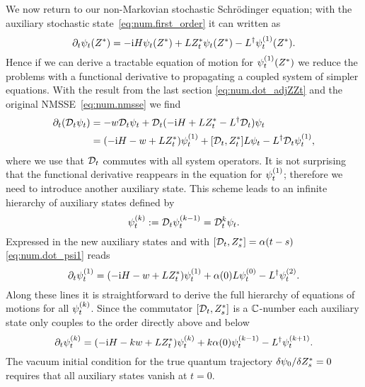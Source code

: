 We now return to our non-Markovian stochastic Schrödinger equation; with the auxiliary stochastic state~\ref{eq:num.first_order} it can written as
\begin{equation*}
  \partial_t \psitZ = -\ii\Hsys\psitZ + L\ZZ_t\psitZ - \adj{L}\psitZ[1].
\end{equation*}
Hence if we can derive a tractable equation of motion for $\psitZ[1]$ we reduce the problems with a functional derivative to propagating a coupled system of simpler equations.
With the result from the last section \autoref{eq:num.dot_adjZZt} and the original NMSSE~\ref{eq:num.nmsse} we find
\begin{align}
  \partial_t (\adjZZ_t \psi_t) &= - w \adjZZ_t\psi_t + \adjZZ_t ( -\ii\Hsys + L\ZZ_t - \adj{L} \adjZZ_t ) \psi_t \nonumber \\
  &= (-\ii\Hsys - w + L\ZZ_t) \psit[1] + [\adjZZ_t, \ZZ_t] L\psit - \adj{L} \adjZZ_t \psit[1],
  \label{eq:num.dot_psi1}
\end{align}
where we use that $\mathcal{D}_t$ commutes with all system operators.
It is not surprising that the functional derivative reappears in the equation for $\psit[1]$; therefore we need to introduce another auxiliary state.
This scheme leads to an infinite hierarchy of auxiliary states defined by
\begin{equation}
  \psit[k] := \adjZZ_t \psit[k-1] = \adjZZ_t^k \psit.
  \label{eq:num.auxiliary_states}
\end{equation}
Expressed in the new auxiliary states and with $[\mathcal{D}_t, {Z}^*_s] = \alpha(t-s)$ \autoref{eq:num.dot_psi1} reads
\begin{equation*}
  \partial_t \psit[1] = (-\ii\Hsys - w + L\ZZ_t) \psit[1] + \alpha(0) L\psit[0] - \adj{L}\psit[2].
\end{equation*}
Along these lines it is straightforward to derive the full hierarchy of equations of motions for all $\psit[k]$.
Since the commutator $[\mathcal{D}_t, {Z}^*_s]$ is a $\mathbb{C}$-number each auxiliary state only couples to the order directly above and below
\begin{equation}
  \partial_t\psit[k] = (-\ii\Hsys - kw + L\ZZ_t)\psit[k] + k \alpha(0) \psit[k-1] - \adj{L} \psit[k+1].
  \label{eq:num.hierarchy_lin}
\end{equation}
The vacuum initial condition for the true quantum trajectory $\delta \psi_0 / \delta {Z}^*_s = 0$ requires that all auxiliary states vanish at $t=0$.


